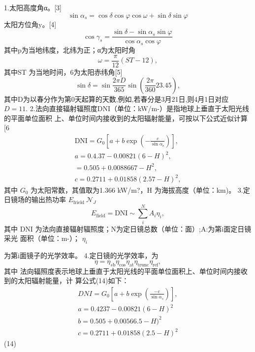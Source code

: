 1.太阳高度角α。[3]
$$
\sin\alpha_{s}=\cos\delta\cos\varphi\cos\omega+\sin\delta\sin\varphi
$$
太阳方位角y。[4]
$$
\cos\gamma_{s}={\frac{\sin\delta-\sin\alpha_{s}\sin\varphi}{\cos\alpha_{s}\cos\varphi}}
$$
其中p为当地纬度，北纬为正；α为太阳时角
$$
\omega={\frac{\pi}{12}}(S T-12),
$$
其中ST 为当地时间，6为太阳赤纬角[5]
$$
\sin\delta=\sin\frac{2\pi D}{365}\sin\left(\frac{2\pi}{360}23.45\right),
$$
其中D为以春分作为第0天起算的天数,例如,若春分是3月21日,则4月1日对应
 $D=11.$ 
2.法向直接辐射辐照度DNI（单位：kW/m-）是指地球上垂直于太阳光线的平面单位面积
上、单位时间内接收到的太阳辐射能量，可按以下公式近似计算[6
$$
\begin{array}{l}{\mathrm{DNI}=G_{0}\left[a+b\exp\left(-\frac{c}{\sin\alpha_{e}}\right)\right],}\\ {a=0.4.37-0.00821(6-H)^{2},}\\ {=0.505+0.0088667-H^{2},}\\ {c=0.2711+0.01858(2.57-H)^{2},}\end{array}
$$
其中
 $G_{\mathrm{0}}$ 
为太阳常数，其值取为1.366 kW/m?，H 为海拔高度（单位：km)。
3.定日镜场的输出热功率
 $E_{\mathrm{frield}}\ {\mathcal{N}}_{J}$ 
$$
E_{\mathrm{field}}=\mathrm{DNI}\sim\sum_{i}^{N}A_{i}\eta_{i},
$$
其中 DNI 为法向直接辐射辐照度；N为定日镜总数（单位：面）;A:为第i面定日镜采光
面积（单位：m-）；
 $\eta_{i}$ 

为第i面镜子的光学效率。
4.定日镜的光学效率，为
$$
\eta=\eta_{s\mathrm{b}}\eta_{\mathrm{cos}}\eta_{\mathrm{at}}\eta_{\mathrm{trunc}}\eta_{\mathrm{ref}},
$$
其中
法向辐照度表示地球上垂直于太阳光线的平面单位面积上、单位时间内接收到的太阳辐射能量，计
算公式(14)如下：
$$
\begin{array}{c}{{D N I=G_{0}\left[a+b\exp\left(\frac{-c}{\sin\alpha_{s}}\right)\right],}}\\ {{a=0.4237-0.00821(6-H)^{2}}}\\ {{b=0.505+0.00566.5-H)^{2}}}\\ {{c=0.2711+0.01858(2.5-H)^{2}}}\end{array}
$$
(14)